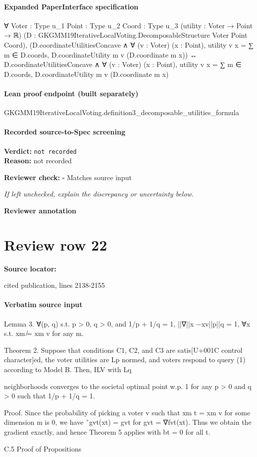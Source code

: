 \documentclass[10pt]{article}
\newcommand{\reviewerbox}{%
  \par\noindent\fbox{\parbox{0.96\linewidth}{\rule{0pt}{0.38in}}}\par
}
\newcommand{\reviewmatch}[1]{%
  \par\noindent\textbf{Reviewer check:} $\square$\; #1\par
  \noindent\emph{If left unchecked, explain the discrepancy or uncertainty below.}\par
}
\begin{document}
\paragraph{Expanded PaperInterface specification}
\begin{ReviewVerbatim}
∀ {Voter : Type u_1} {Point : Type u_2} {Coord : Type u_3} (utility : Voter → Point → ℝ)
  (D : GKGMM19IterativeLocalVoting.DecomposableStructure Voter Point Coord),
  (D.coordinateUtilitiesConcave ∧
      ∀ (v : Voter) (x : Point), utility v x = ∑ m ∈ D.coords, D.coordinateUtility m v (D.coordinate m x)) ↔
    D.coordinateUtilitiesConcave ∧
      ∀ (v : Voter) (x : Point), utility v x = ∑ m ∈ D.coords, D.coordinateUtility m v (D.coordinate m x)
\end{ReviewVerbatim}

\paragraph{Lean proof endpoint (built separately)}\begin{ReviewVerbatim}
GKGMM19IterativeLocalVoting.definition3_decomposable_utilities_formula
\end{ReviewVerbatim}

\paragraph{Recorded source-to-Spec screening}
\textbf{Verdict:} \texttt{not recorded}
\\
\textbf{Reason:} not recorded
\reviewmatch{Matches source input}
\noindent\textbf{Reviewer annotation}\par
\reviewerbox
\clearpage
\hypertarget{source-claim-a973f59ed0e1cc66}{}
\section*{Review row 22}
\textbf{Source locator:} {\footnotesize\raggedright cited publication, lines 2138-\allowbreak{}2155\par}
\paragraph{Verbatim source input}
\begin{ReviewVerbatim}
Lemma 3. ∀(p, q) s.t. p > 0, q > 0, and 1/p + 1/q = 1, ||∇||x −xv||p||q = 1, ∀x s.t.
xm ̸= xm
v for any m.

Theorem 2. Suppose that conditions C1, C2, and C3 are satis[U+001C control character]ed, the voter utilities are
Lp normed, and voters respond to query (1) according to Model B. Then, ILV with Lq

neighborhoods converges to the societal optimal point w.p. 1 for any p > 0 and q > 0 such
that 1/p + 1/q = 1.

Proof. Since the probability of picking a voter v such that xm
t = xm
v for some dimension m
is 0, we have ˜gvt(xt) = gvt for gvt = ∇fvt(xt). Thus we obtain the gradient exactly, and
hence Theorem 5 applies with bt = 0 for all t.

C.5 Proof of Propositions
\end{ReviewVerbatim}
\end{document}
